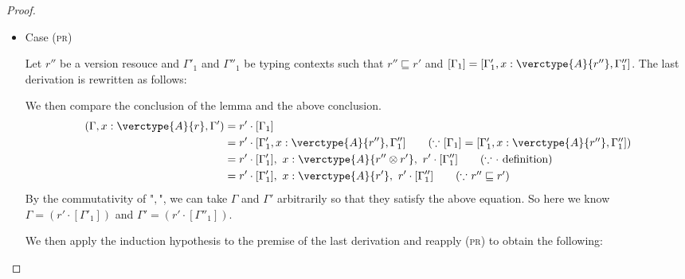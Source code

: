 \begin{proof}
\begin{itemize}
\item Case (\textsc{pr})
\begin{center}
    \begin{minipage}{.40\linewidth}
    \end{minipage}
\end{center}
Let $r''$ be a version resouce and $\Gamma'_1$ and $\Gamma''_1$ be typing contexts such that $r'' \sqsubseteq r'$ and $[\Gamma_1] = [\Gamma'_1, x:\verctype{A}{r''}, \Gamma''_1]$.
The last derivation is rewritten as follows:
\begin{center}
    \begin{minipage}{.55\linewidth}
    \end{minipage}
\end{center}
We then compare the conclusion of the lemma and the above conclusion.
\begin{align*}
(\Gamma, x:\verctype{A}{r}, \Gamma') &= r' \cdot [\Gamma_1]\\
&= r' \cdot [\Gamma'_1, x:\verctype{A}{r''}, \Gamma''_1]\tag{$\because$ $[\Gamma_1] = [\Gamma'_1, x:\verctype{A}{r''}, \Gamma''_1]$}\\
&= r'\cdot[\Gamma'_1], \ x:\verctype{A}{r''\otimes r'}, \ r'\cdot[\Gamma''_1]\tag{$\because$ $\cdot$ definition}\\
&= r'\cdot[\Gamma'_1], \ x:\verctype{A}{r'}, \ r'\cdot[\Gamma''_1] \tag{$\because$ $r''\sqsubseteq r'$}
\end{align*}
By the commutativity of "$,$", we can take $\Gamma$ and $\Gamma'$ arbitrarily so that they satisfy the above equation. So here we know $\Gamma = (r'\cdot[\Gamma'_1])$ and $\Gamma' = (r'\cdot[\Gamma''_1])$.\par
We then apply the induction hypothesis to the premise of the last derivation and reapply (\textsc{pr}) to obtain the following:
\begin{center}
    \begin{minipage}{.6\linewidth}
\end{minipage}
\end{center}
\end{itemize}
\end{proof}
